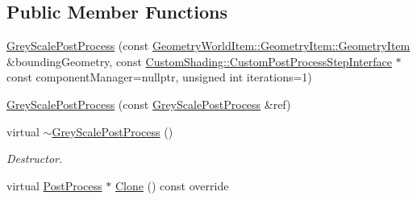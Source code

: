 \subsection*{Public Member Functions}
\begin{DoxyCompactItemize}
\item 
\mbox{\hyperlink{class_geometry_engine_1_1_geometry_post_process_1_1_single_pass_post_process_1_1_grey_scale_post_process_a1072395d3c80b7765ff98a2fdb211de1}{Grey\+Scale\+Post\+Process}} (const \mbox{\hyperlink{class_geometry_engine_1_1_geometry_world_item_1_1_geometry_item_1_1_geometry_item}{Geometry\+World\+Item\+::\+Geometry\+Item\+::\+Geometry\+Item}} \&bounding\+Geometry, const \mbox{\hyperlink{class_geometry_engine_1_1_custom_shading_1_1_custom_post_process_step_interface}{Custom\+Shading\+::\+Custom\+Post\+Process\+Step\+Interface}} $\ast$const component\+Manager=nullptr, unsigned int iterations=1)
\item 
\mbox{\hyperlink{class_geometry_engine_1_1_geometry_post_process_1_1_single_pass_post_process_1_1_grey_scale_post_process_a3afc3201292b7456476355c821584c6a}{Grey\+Scale\+Post\+Process}} (const \mbox{\hyperlink{class_geometry_engine_1_1_geometry_post_process_1_1_single_pass_post_process_1_1_grey_scale_post_process}{Grey\+Scale\+Post\+Process}} \&ref)
\item 
\mbox{\label{class_geometry_engine_1_1_geometry_post_process_1_1_single_pass_post_process_1_1_grey_scale_post_process_ac8bd8d19e6dfb8407d64a3d62c1fa3a7}} 
virtual \mbox{\hyperlink{class_geometry_engine_1_1_geometry_post_process_1_1_single_pass_post_process_1_1_grey_scale_post_process_ac8bd8d19e6dfb8407d64a3d62c1fa3a7}{$\sim$\+Grey\+Scale\+Post\+Process}} ()
\begin{DoxyCompactList}\small\item\em Destructor. \end{DoxyCompactList}\item 
virtual \mbox{\hyperlink{class_geometry_engine_1_1_geometry_post_process_1_1_post_process}{Post\+Process}} $\ast$ \mbox{\hyperlink{class_geometry_engine_1_1_geometry_post_process_1_1_single_pass_post_process_1_1_grey_scale_post_process_a36f198711874587c9cbf5c958e6d09ea}{Clone}} () const override
\end{DoxyCompactItemize}
